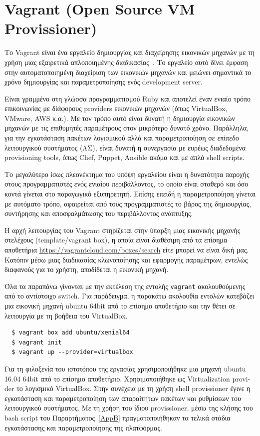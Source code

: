 \documentclass[12pt]{report}
\begin{document}
\section{\textlatin{\textlatin{Vagrant (Open Source VM Provissioner)}}}\label{vagrant}
Το \textlatin{Vagrant} είναι ένα εργαλείο δημιουργίας και διαχείρησης εικονικών μηχανών με τη χρήση μιας εξαιρετικά απλοποιημένης διαδικασίας~\cite{vagrant_by_hashicorp}. Το εργαλείο αυτό δίνει έμφαση στην αυτοματοποιημένη διαχείριση των εικονικών μηχανών και μειώνει σημαντικά το χρόνο δημιουργίας και παραμετροποίησης ενός \textlatin{development server}.

Είναι γραμμένο στη γλώσσα προγραμματισμού \textlatin{Ruby} και αποτελεί έναν ενιαίο τρόπο επικοινωνίας με δίάφορους \textlatin{providers} εικονικών μηχανών (όπως \textlatin{VirtualBox, VMware, AWS} κ.α.). Με τον τρόπο αυτό είναι δυνατή η δημιουργία εικονικών μηχανών με τις επιθυμητές παραμέτρους στον μικρότερο δυνατό χρόνο. Παράλληλα, για την εγκατάσταση πακέτων λογισμικού αλλά και παραμετροποίηση σε επίπεδο λειτουργικού συστήματος (ΛΣ), είναι δυνατή η συνεργασία με ευρέως διαδεδομένα \textlatin{provisioning tools}, όπως \textlatin{Chef, Puppet, Ansible} ακόμα και με απλά \textlatin{shell scripts}.

Το μεγαλύτερο ίσως πλεονέκτημα του υπόψη εργαλείου είναι η δυνατότητα παροχής στους προγραμματιστές ενός ενιαίου περιβάλλοντος, το οποίο είναι σταθερό και όσο κοντά γίνεται στο παραγωγικό εξυπηρετητή. Επίσης επειδή η παραμετροποίηση γίνεται με αυτόματο τρόπο, αφαιρείται από τους προγραμματιστές το βάρος της δημιουργίας, συντήρησης και αποσφαλμάτωσης του περιβάλλοντος ανάπτυξης.

Η αρχή λειτουργίας του \textlatin{Vagrant} στηρίζεται στην ύπαρξη μιας εικονικής μηχανής στελέχους (\textlatin{template/vagrant box}), η οποία είναι διαθέσιμη από τα επίσημα αποθετήρια \textlatin{\url{https://vagrantcloud.com/boxes/search}} είτε μπορεί να είναι δική μας. Κατόπιν μέσω μιας διαδικασίας κλωνοποίησης και εφαρμογής παραμέτρων, εντελώς διαφανούς για το χρήστη, αποδίδεται η εικονική μηχανή.

Όλα τα παραπάνω γίνονται με την εκτέλεση της εντολής \textlatin{\texttt{vagrant}} ακολουθούμενης από το αντίστοιχο \textlatin{switch}. Για παράδειγμα, η παρακάτω ακολουθία εντολών κατεβάζει μια εικονική μηχανή \textlatin{ubuntu 64bit} από το επίσημο αποθετήριο και την θέτει σε λειτουργία με τη βοήθεια του \textlatin{VirtualBox}.
\begin{lstlisting}
  $ vagrant box add ubuntu/xenial64
  $ vagrant init
  $ vagrant up --provider=virtualbox
\end{lstlisting}
Για τη φιλοξενία του ιστοτόπου της εργασίας χρησιμοποιήθηκε μια μηχανή \textlatin{ubuntu 16.04 64bit} από το επίσημο αποθετήριο. Χρησιμοποιήθηκε ως \textlatin{Virtualization provider} το λογισμικό \textlatin{VirtualBox}. Στην συνέχεια με τη χρήση \textlatin{shell provissioner} έγινε η εγκατάσταση και παραμετροποίηση των απαραίτητων πακέτων και ρυθμίσεων του λειτουργικού συστήματος. Με τη χρήση του ίδιου \textlatin{provissioner}, μέσω της κλήσης του \textlatin{bash script} του Παραρτήματος~\ref{AppB} πραγματοποιήθηκαν τα τελικά στάδια εγκατάστασης και παραμετροποίησης της πλατφόρμας.
\end{document}
